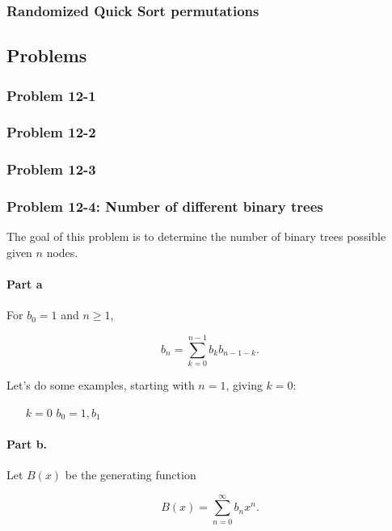 \documentclass{article}
\begin{document}
\subsubsection{Randomized Quick Sort permutations}

\subsection{Problems}

\subsubsection{Problem 12-1}

\subsubsection{Problem 12-2}

\subsubsection{Problem 12-3}

\subsubsection{Problem 12-4: Number of different binary trees}

The goal of this problem is to determine the number of binary
trees possible given $n$ nodes.

\paragraph{Part a} For $b_0 = 1$ and $n \geq 1$,

\[
b_n = \sum_{k=0}^{n-1} b_kb_{n-1-k}.
\]

Let's do some examples, starting with $n = 1$, giving $k = 0$:

\begin{itemize}
\item [$k=0$] $b_0 = 1, b_1$
\end{itemize}

\paragraph{Part b.} Let $B(x)$ be the generating function

\begin{equation}
B(x) = \sum_{n=0}^{\infty}b_nx^n.
\end{equation}
\end{document}
